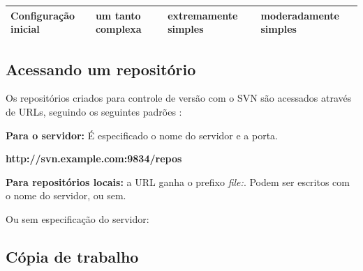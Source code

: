 \begin{table}[]
\begin{tabular}{|l|l|l|l|}
Configuração inicial                           & um tanto complexa                                                                                                                                                        & extremamente simples                                                                                                                         & moderadamente simples                                                          \\ \hline
\end{tabular}
\end{table}
\subsection{Acessando um repositório}

  Os repositórios criados para controle de versão com o SVN são acessados através de URLs, seguindo os seguintes padrões \cite{svn-book}:

\begin{centering}

\textbf{Para o servidor:} É especificado o nome do servidor e a porta.

\colorbox{PineGreen}{
\begin{minipage}{220px}
  \textbf{http://svn.example.com:9834/repos}
\end{minipage}
}

\textbf{Para repositórios locais:} a URL ganha o prefixo \textit{file:}. Podem ser escritos com o nome do servidor, ou sem.
\end{centering}

\begin{multicols}{2} 



Ou sem especificação do servidor:

\colorbox{PineGreen}{
\begin{minipage}{200px}
\end{minipage}
}

\end{multicols}




\subsection{Cópia de trabalho}
  
